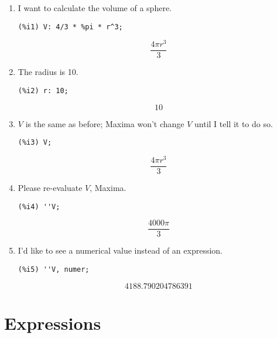 \documentclass[12pt,leqno]{article}
\begin{document}
\begin{enumerate}

\item I want to calculate the volume of a sphere.
\begin{verbatim}
(%i1) V: 4/3 * %pi * r^3;
\end{verbatim}
\begin{dmath}[number={\(\mathop{\mathrm{\%o}_{1}}\)}]
\frac{4 \pi {r}^{3}}{3}
\end{dmath}

\item The radius is 10.
\begin{verbatim}
(%i2) r: 10;
\end{verbatim}
\begin{dmath}[number={\(\mathop{\mathrm{\%o}_{2}}\)}]
10
\end{dmath}

\item $V$ is the same as before; Maxima won't change $V$ until I tell it to do so.
\begin{verbatim}
(%i3) V;
\end{verbatim}
\begin{dmath}[number={\(\mathop{\mathrm{\%o}_{3}}\)}]
\frac{4 \pi {r}^{3}}{3}
\end{dmath}

\item Please re-evaluate $V$, Maxima.
\begin{verbatim}
(%i4) ''V;
\end{verbatim}
\begin{dmath}[number={\(\mathop{\mathrm{\%o}_{4}}\)}]
\frac{4000 \pi}{3}
\end{dmath}

\item I'd like to see a numerical value instead of an expression.
\begin{verbatim}
(%i5) ''V, numer;
\end{verbatim}
\begin{dmath}[number={\(\mathop{\mathrm{\%o}_{5}}\)}]
4188.790204786391
\end{dmath}

\end{enumerate}

\section{Expressions}
\end{document}
